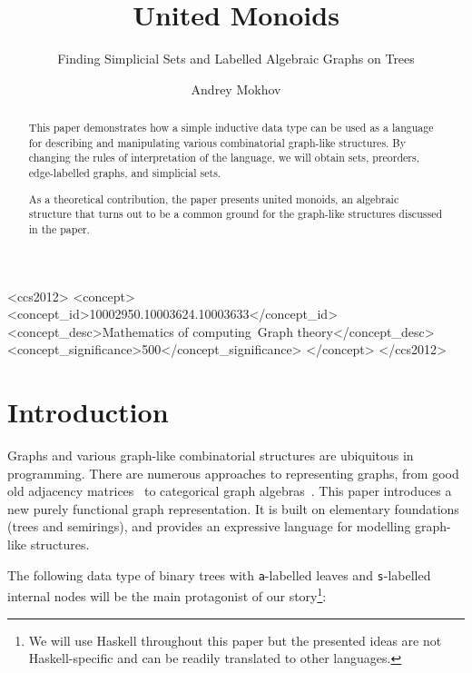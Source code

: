 \documentclass[english,submission]{programming}
\newcommand{\hcode}[1]{{\color{darkblue} \lstinline[keywordstyle={}]|#1|}} %
\begin{document}

\title{United Monoids}
\subtitle{Finding Simplicial Sets and Labelled Algebraic Graphs on Trees}
\author{Andrey Mokhov}


\begin{CCSXML}
<ccs2012>
<concept>
<concept_id>10002950.10003624.10003633</concept_id>
<concept_desc>Mathematics of computing~Graph theory</concept_desc>
<concept_significance>500</concept_significance>
</concept>
</ccs2012>
\end{CCSXML}


\maketitle

\begin{abstract}
This paper demonstrates how a simple inductive data type can be used as a
language for describing and manipulating various combinatorial graph-like
structures. By changing the rules of interpretation of the language, we will
obtain sets, preorders, edge-labelled graphs, and simplicial sets.

As a theoretical contribution, the paper presents united monoids, an algebraic
structure that turns out to be a common ground for the graph-like structures
discussed in the paper.
\end{abstract}

\section{Introduction}
\vspace{-1mm}

Graphs and various graph-like combinatorial structures are ubiquitous in
programming. There are numerous approaches to representing graphs, from good old
adjacency matrices~\cite{cormen2009introduction} to categorical graph
algebras~\cite{2010_selinger_survey}. This paper introduces a new purely
functional graph representation. It is built on elementary foundations
(trees and semirings), and provides an expressive language for modelling
graph-like structures.

The following data type of binary trees with \hcode{a}-labelled leaves and
\hcode{s}-labelled internal nodes will be the main protagonist of our
story\footnote{
    We will use Haskell throughout this paper but the presented ideas
    are not Haskell-specific and can be readily translated to other languages.
}:
\end{document}
